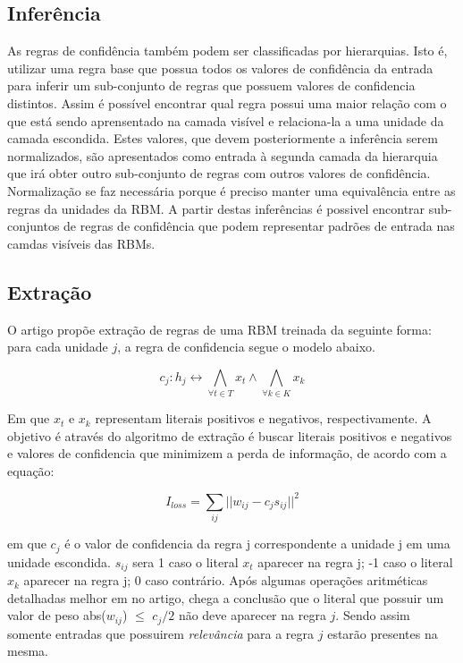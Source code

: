 \documentclass[a4paper, 12pt]{article}
\begin{document}
    \subsection{Inferência}
    As regras de confidência também podem ser classificadas por hierarquias\cite{Tran}. Isto é, utilizar uma regra base que possua todos os valores de confidência da entrada para inferir um sub-conjunto de regras que possuem valores de confidencia distintos. Assim é possível encontrar qual regra possui uma maior relação com o que está sendo aprensentado na camada visível e relaciona-la a uma unidade da camada escondida. Estes valores, que devem posteriormente a inferência serem normalizados, são apresentados como entrada à segunda camada da hierarquia que irá obter outro sub-conjunto de regras com outros valores de confidência. Normalização se faz necessária porque é preciso manter uma equivalência entre as regras da unidades da RBM. A partir destas inferências é possivel encontrar sub-conjuntos de regras de confidência que podem representar padrões de entrada nas camdas visíveis das RBMs.
    \subsection{Extração}
    O artigo\cite{Tran} propõe extração de regras de uma RBM treinada da seguinte forma: para cada unidade $j$, a regra de confidencia segue o modelo abaixo.
    
    \begin{equation}
        c_j : h_j \leftrightarrow \bigwedge_{\forall t \in T} x_t \wedge \bigwedge_{\forall k \in K} x_k
    \end{equation}
    
    Em que $x_t$ e $x_k$ representam literais positivos e negativos, respectivamente. A objetivo é através do algoritmo de extração é buscar literais positivos e negativos e valores de confidencia que minimizem a perda de informação, de acordo com a equação:
    
    \begin{equation}
        I_{loss} = \sum_{ij}||w_{ij} - c_js_{ij} ||^2
    \end{equation}
    
    em que $c_j$ é o valor de confidencia da regra j correspondente a unidade j em uma unidade escondida\cite{Tran}. $s_{ij}$ sera 1 caso o literal $x_t$ aparecer na regra j; -1 caso o literal $x_k$ aparecer na regra j; 0 caso contrário. Após algumas operações aritméticas detalhadas melhor em no artigo, \cite{Tran} chega a conclusão que o literal que possuir um valor de peso abs($w_{ij}$) $\leq$ $c_j/2$ não deve aparecer na regra $j$. Sendo assim somente entradas que possuirem \textit{relevância} para a regra $j$ estarão presentes na mesma.
    
\end{document}

